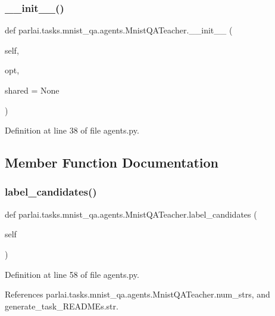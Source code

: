 \subsubsection{\texorpdfstring{\+\_\+\+\_\+init\+\_\+\+\_\+()}{\_\_init\_\_()}}
{\footnotesize\ttfamily def parlai.\+tasks.\+mnist\+\_\+qa.\+agents.\+Mnist\+Q\+A\+Teacher.\+\_\+\+\_\+init\+\_\+\+\_\+ (\begin{DoxyParamCaption}\item[{}]{self,  }\item[{}]{opt,  }\item[{}]{shared = {\ttfamily None} }\end{DoxyParamCaption})}



Definition at line 38 of file agents.\+py.



\subsection{Member Function Documentation}
\mbox{\label{classparlai_1_1tasks_1_1mnist__qa_1_1agents_1_1MnistQATeacher_ab00955aa62e9056a3b3a3f712a07fa93}} 
\subsubsection{\texorpdfstring{label\+\_\+candidates()}{label\_candidates()}}
{\footnotesize\ttfamily def parlai.\+tasks.\+mnist\+\_\+qa.\+agents.\+Mnist\+Q\+A\+Teacher.\+label\+\_\+candidates (\begin{DoxyParamCaption}\item[{}]{self }\end{DoxyParamCaption})}



Definition at line 58 of file agents.\+py.



References parlai.\+tasks.\+mnist\+\_\+qa.\+agents.\+Mnist\+Q\+A\+Teacher.\+num\+\_\+strs, and generate\+\_\+task\+\_\+\+R\+E\+A\+D\+M\+Es.\+str.

